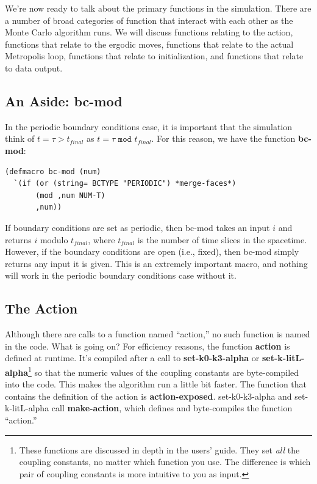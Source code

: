 \message{ !name(programmers_guide.tex)}\documentclass[12pt]{article}
\begin{document}
We're now ready to talk about the primary functions in the
simulation. There are a number of broad categories of function that
interact with each other as the Monte Carlo algorithm runs. We will
discuss functions relating to the action, functions that relate to the
ergodic moves, functions that relate to the actual Metropolis loop,
functions that relate to initialization, and functions that relate to
data output.

\subsection{An Aside: bc-mod}

In the periodic boundary conditions case, it is important that the
simulation think of $t = \tau > t_{final}$ as $t = \tau \texttt{ mod }
t_{final}$. For this reason, we have the function \textbf{bc-mod}:
\begin{lstlisting}
(defmacro bc-mod (num)
  `(if (or (string= BCTYPE "PERIODIC") *merge-faces*)
       (mod ,num NUM-T)
       ,num))
\end{lstlisting}
If boundary conditions are set as periodic, then bc-mod takes an input
$i$ and returns $i$ modulo $t_{final}$, where $t_{final}$ is the
number of time slices in the spacetime. However, if the boundary
conditions are open (i.e., fixed), then bc-mod simply returns any
input it is given. This is an extremely important macro, and nothing
will work in the periodic boundary conditions case without it.

\subsection{The Action}

Although there are calls to a function named ``action,'' no such
function is named in the code. What is going on? For efficiency
reasons, the function \textbf{action} is defined at runtime. It's
compiled after a call to \textbf{set-k0-k3-alpha} or
\textbf{set-k-litL-alpha}\footnote{These functions are discussed in
  depth in the users' guide. They set \textit{all} the coupling
  constants, no matter which function you use. The difference is which
  pair of coupling constants is more intuitive to you as input.} so
that the numeric values of the coupling constants are byte-compiled
into the code. This makes the algorithm run a little bit faster. The
function that contains the definition of the action is
\textbf{action-exposed}. set-k0-k3-alpha and set-k-litL-alpha call
\textbf{make-action}, which defines and byte-compiles the function
``action.''
\end{document}
